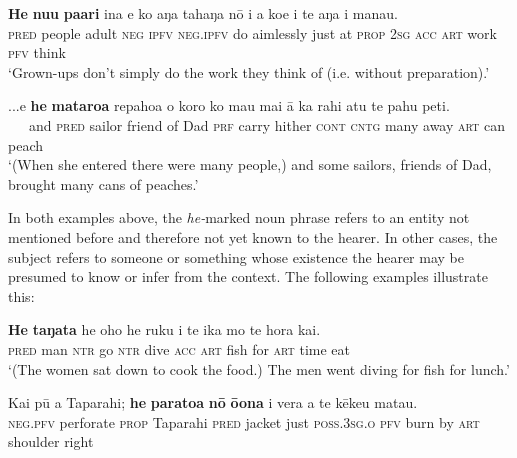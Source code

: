 \ea\label{ex:8.91}
\gll \textbf{He} \textbf{nu{\ꞌ}u} \textbf{pa{\ꞌ}ari} {\ꞌ}ina e ko aŋa tahaŋa nō i a koe  i te aŋa i mana{\ꞌ}u.\\
\textsc{pred} people adult \textsc{neg} \textsc{ipfv} \textsc{neg.ipfv} do aimlessly just at \textsc{prop} \textsc{2sg}  \textsc{acc} \textsc{art} work \textsc{pfv} think\\

\glt 
‘Grown-ups don’t simply do{\rmfnm} the work they think of (i.e. without preparation).’ \textstyleExampleref{[R363.145]} 
\z
{}

\ea\label{ex:8.92}
\gll ...{\ꞌ}e \textbf{he} \textbf{mataroa} repahoa o koro ko ma{\ꞌ}u mai {\ꞌ}ā ka rahi atu  te pahu peti.\\
~~~and \textsc{pred} sailor friend of Dad \textsc{prf} carry hither \textsc{cont} \textsc{cntg} many away  \textsc{art} can peach\\

\glt
‘(When she entered there were many people,) and some sailors, friends of Dad, brought many cans of peaches.’ \textstyleExampleref{[R210.125]}
\z

In both examples above, the \textit{he-}marked noun phrase refers to an entity not mentioned before and therefore not yet known to the hearer. In other cases, the subject refers to someone or something whose existence the hearer may be presumed to know or infer from the context. The following examples illustrate this:

\ea\label{ex:8.93}
\gll \textbf{He} \textbf{taŋata} he oho he ruku i te ika mo te hora kai. \\
\textsc{pred} man \textsc{ntr} go \textsc{ntr} dive \textsc{acc} \textsc{art} fish for \textsc{art} time eat \\

\glt 
‘(The women sat down to cook the food.) The men went diving for fish for lunch.’ \textstyleExampleref{[R183.019]} 
\z

\ea\label{ex:8.94}
\gll Kai pū a Taparahi; \textbf{he} \textbf{paratoa} \textbf{nō} \textbf{ō{\ꞌ}ona} i vera a te kēke{\ꞌ}u mata{\ꞌ}u.\\
\textsc{neg.pfv} perforate \textsc{prop} Taparahi \textsc{pred} jacket just \textsc{poss.3sg.o} \textsc{pfv} burn by \textsc{art} shoulder right\\

